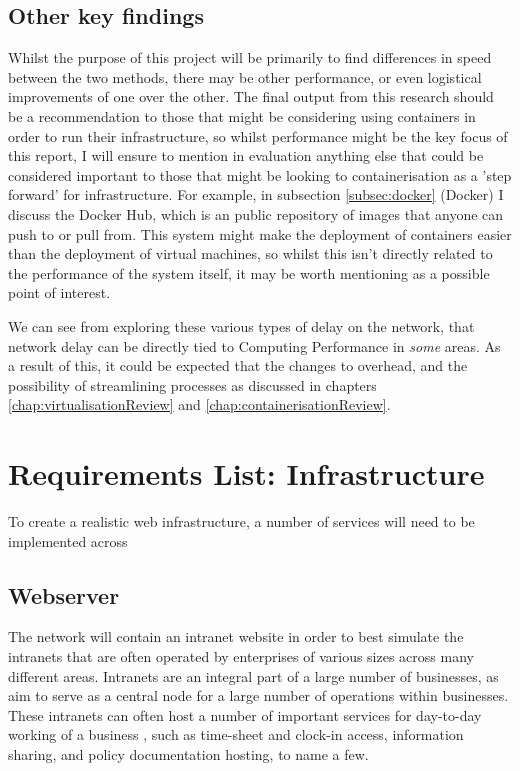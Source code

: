 \begin{itemize}
\subsection{Other key findings}
Whilst the purpose of this project will be primarily to find differences in speed between the two methods, there may be other performance, or even logistical improvements of one over the other. The final output from this research should be a recommendation to those that might be considering using containers in order to run their infrastructure, so whilst performance might be the key focus of this report, I will ensure to mention in evaluation anything else that could be considered important to those that might be looking to containerisation as a 'step forward' for infrastructure. For example, in subsection \ref{subsec:docker} (Docker) I discuss the Docker Hub, which is an public repository of images that anyone can push to or pull from. This system might make the deployment of containers easier than the deployment of virtual machines, so whilst this isn't directly related to the performance of the system itself, it may be worth mentioning as a possible point of interest.
\end{itemize}

We can see from exploring these various types of delay on the network, that network delay can be directly tied to Computing Performance in \emph{some} areas. As a result of this, it could be expected that the changes to overhead, and the possibility of streamlining processes as discussed in chapters \ref{chap:virtualisationReview} and \ref{chap:containerisationReview}.

\section{Requirements List: Infrastructure}
\label{Requirements:infrastructure}
To create a realistic web infrastructure, a number of services will need to be implemented across 

\subsection{Webserver}
\label{subsec:webserver}
The network will contain an intranet website in order to best simulate the intranets that are often operated by enterprises of various sizes across many different areas. Intranets are an integral part of a large number of businesses, as aim to serve as a central node for a large number of operations within businesses. These intranets can often host a number of important services for day-to-day working of a business \citep{jacoby2005critical}, such as time-sheet and clock-in access, information sharing, and policy documentation hosting, to name a few.


